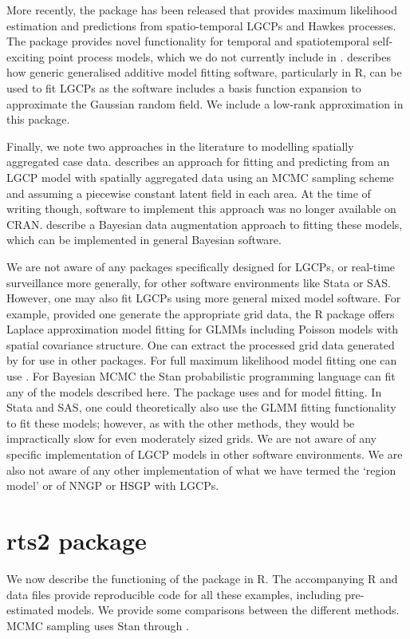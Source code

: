 More recently, the package  \citep{JonesTodd2024} has been released that provides maximum likelihood estimation and predictions from spatio-temporal LGCPs and Hawkes processes. The package provides novel functionality for temporal and spatiotemporal self-exciting point process models, which we do not currently include in . \citet{Dovers2024}
describes how generic generalised additive model fitting software, particularly  in R, can be used to fit LGCPs as the software includes a basis function expansion to approximate the Gaussian random field. We include a low-rank approximation in this package. 

Finally, we note two approaches in the literature to modelling spatially aggregated case data. \citep{Johnson2019} describes an approach for fitting and predicting from an LGCP model with spatially aggregated data using an MCMC sampling scheme and assuming a piecewise constant latent field in each area. At the time of writing though, software to implement this approach was no longer available on CRAN. \citet{Li2012} describe a Bayesian data augmentation approach to fitting these models, which can be implemented in general Bayesian software.

We are not aware of any packages specifically designed for LGCPs, or real-time surveillance more generally, for other software environments like Stata or SAS. However, one may also fit LGCPs using more general mixed model software. For example, provided one generate the appropriate grid data, the R package  offers Laplace approximation model fitting for GLMMs including Poisson models with spatial covariance structure. One can extract the processed grid data generated by  for use in other packages. For full maximum likelihood model fitting one can use . For Bayesian MCMC the Stan probabilistic programming language can fit any of the models described here. The  package uses  and  for model fitting. In Stata and SAS, one could theoretically also use the GLMM fitting functionality to fit these models; however, as with the other methods, they would be impractically slow for even moderately sized grids. We are not aware of any specific implementation of LGCP models in other software environments.  We are also not aware of any other implementation of what we have termed the `region model' or of NNGP or HSGP with LGCPs.

\section{rts2 package}
We now describe the functioning of the package in R. The accompanying R and data files provide reproducible code for all these examples, including pre-estimated models. We provide some comparisons between the different methods. MCMC sampling uses Stan through  \citep{Carpenter2017}. 

